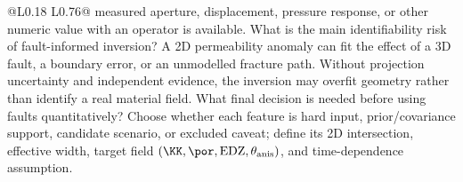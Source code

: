 \begin{longtable}{@{}L{0.18\textwidth} L{0.76\textwidth}@{}}
{measured aperture, displacement, pressure response, or other numeric value with an
operator is available.}
{ What is the main identifiability risk of fault-informed inversion?}
{A 2D permeability anomaly can fit the effect of a 3D fault, a boundary error, or an
unmodelled fracture path.  Without projection uncertainty and independent evidence,
the inversion may overfit geometry rather than identify a real material field.}
{ What final decision is needed before using faults quantitatively?}
{Choose whether each feature is hard input, prior/covariance support, candidate
scenario, or excluded caveat; define its 2D intersection, effective width, target
field \((\KK,\por,\mathrm{EDZ},\theta_{\mathrm{anis}})\), and time-dependence
assumption.}
\bottomrule
\end{longtable}

